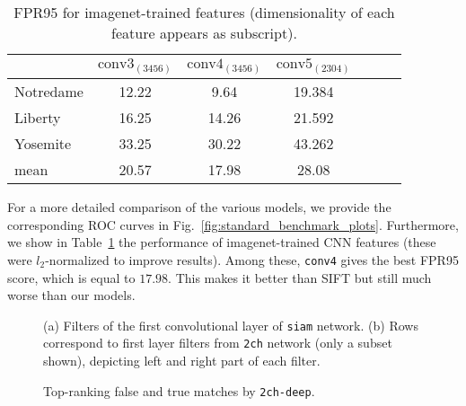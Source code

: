 \documentclass[10pt,twocolumn,letterpaper]{article}
\newcommand*{\USEIMAGES}{}
\begin{document}
\begin{table}

\begin{center}
\small
\begin{tabular}{lcccccc}
\hline
 & $\mathrm{conv3}_{(3456)}$  &   $\mathrm{conv4}_{(3456)}$  & $\mathrm{conv5}_{(2304)}$ \\ 
\hline
Notredame     & 12.22  & 9.64  & 19.384 \\
Liberty            & 16.25  & 14.26  & 21.592 \\
Yosemite        & 33.25  & 30.22  & 43.262 \\ \hline
mean  & 20.57  &17.98  &  28.08 \\
\hline
\end{tabular}
\small
\end{center}
\caption{FPR95 for imagenet-trained features (dimensionality of each feature appears as subscript).}
\label{standard_benchmark_imagenet}
\vspace{-10pt}
\end{table}

 
For a more detailed comparison of the various models, we  provide the corresponding ROC curves in Fig.~\ref{fig:standard_benchmark_plots}. Furthermore,  we show in Table~\ref{standard_benchmark_imagenet} the performance of imagenet-trained CNN features (these were $l_2$-normalized to improve results). Among these, \texttt{conv4} gives the best FPR95 score, which is equal to $17.98$. This makes it better than SIFT but still much worse than our models. 

\ifdefined\USEIMAGES
\begin{figure}[h]
\centering
%
\hspace{1cm}
%
\caption{(a) Filters of the first convolutional layer of \texttt{siam} network. (b) Rows correspond to  first layer filters from \texttt{2ch} network (only a subset shown), depicting left and right  part of each filter.}
\end{figure}
\vspace{-15pt}
\fi

\ifdefined\USEIMAGES
\begin{figure}[h]
\centering
%
%
\caption{Top-ranking false and true matches by \texttt{2ch-deep}.}
\label{fig:false_true_matches}
\vspace{-5pt}
\end{figure}
\fi
\end{document}

